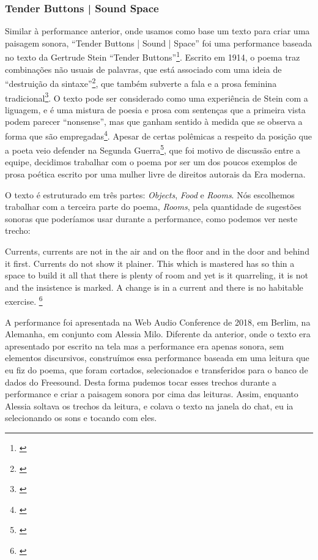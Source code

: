 \subsubsection{Tender Buttons | Sound Space}
Similar à performance anterior, onde usamos como base um texto para criar uma paisagem sonora, ``Tender Buttons | Sound | Space''  foi uma performance baseada no texto da Gertrude Stein ``Tender Buttons''\footnote{\cite{Stein1914}}. Escrito em 1914, o poema traz combinações não usuais de palavras, que está associado com uma ideia de ``destruição da sintaxe''\footnote{\cite{Perloff1996}}, que também subverte a fala e a prosa feminina tradicional\footnote{\cite{Murphy1991}}. O texto pode ser considerado como uma experiência de Stein com a liguagem, e é uma mistura de poesia e prosa com sentenças que a primeira vista podem parecer ``nonsense'', mas que ganham sentido à medida que se observa a forma que são empregadas\footnote{\cite{Perloff1996}}. Apesar de certas polêmicas a respeito da posição que a poeta veio defender na Segunda Guerra\footnote{\cite{Bernstein2012}}, que foi motivo de discussão entre a equipe, decidimos trabalhar com o poema por ser um dos poucos exemplos de prosa poética escrito por uma mulher livre de direitos autorais da Era moderna.

O texto é estruturado em três partes: \textit{Objects}, \textit{Food} e \textit{Rooms}. Nós escolhemos trabalhar com a terceira parte do poema, \textit{Rooms}, pela quantidade de sugestões sonoras que poderíamos usar durante a performance, como podemos ver neste trecho:

\begin{citacao}
Currents, currents are not in the air and on the floor and in the door and behind it first. Currents do not show it plainer. This which is mastered has so thin a space to build it all that there is plenty of room and yet is it quarreling, it is not and the insistence is marked. A change is in a current and there is no habitable exercise. \footnote{\cite{Stein1914}}
\end{citacao} 

A performance foi apresentada na Web Audio Conference de 2018, em Berlim, na Alemanha, em conjunto com Alessia Milo. Diferente da anterior, onde o texto era apresentado por escrito na tela mas a performance era apenas sonora, sem elementos discursivos, construímos essa performance baseada em uma leitura que eu fiz do poema, que foram cortados, selecionados e transferidos para o banco de dados do Freesound. Desta forma pudemos tocar esses trechos durante a performance e criar a paisagem sonora por cima das leituras. Assim, enquanto Alessia soltava os trechos da leitura, e colava o texto na janela do chat, eu ia selecionando os sons e tocando com eles. 

